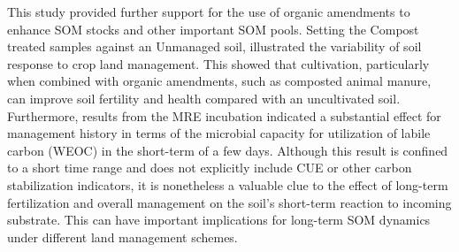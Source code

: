 	This study provided further support for the use of organic amendments to enhance SOM stocks and other important SOM pools. Setting the Compost treated samples against an Unmanaged soil, illustrated the variability of soil response to crop land management. This showed that cultivation, particularly when combined with organic amendments, such as composted animal manure, can improve soil fertility and health compared with an uncultivated soil.\\
	Furthermore, results from the MRE incubation indicated a substantial effect for management history in terms of the microbial capacity for utilization of labile carbon (WEOC) in the short-term of a few days. Although this result is confined to a short time range and does not explicitly include CUE or other carbon stabilization indicators, it is nonetheless a valuable clue to the effect of long-term fertilization and overall management on the soil's short-term reaction to incoming substrate. This can have important implications for long-term SOM dynamics under different land management schemes.  
	         
	
	
     
